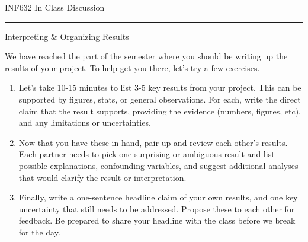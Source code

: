 \documentclass[11pt]{article}
\begin{document}
\Huge INF632 In Class Discussion
\normalsize ~

\noindent\rule{\textwidth}{1pt}\vspace{.5em}

\LARGE Interpreting \& Organizing Results
\normalsize ~

We have reached the part of the semester where you should be writing up the results of your project.  To help get you there, let's try a few exercises.

\begin{enumerate}
\item Let's take 10-15 minutes to list 3-5 key results from your project.  This can be supported by figures, stats, or general observations.  For each, write the direct claim that the result supports, providing the evidence (numbers, figures, etc), and any limitations or uncertainties.

\vspace{8in}

\item Now that you have these in hand, pair up and review each other's results.  Each partner needs to pick one surprising or ambiguous result and list possible explanations, confounding variables, and suggest additional analyses that would clarify the result or interpretation.

\vspace{5in}

\item Finally, write a one-sentence headline claim of your own results, and one key uncertainty that still needs to be addressed.  Propose these to each other for feedback.  Be prepared to share your headline with the class before we break for the day.

\end{enumerate}
\end{document}
